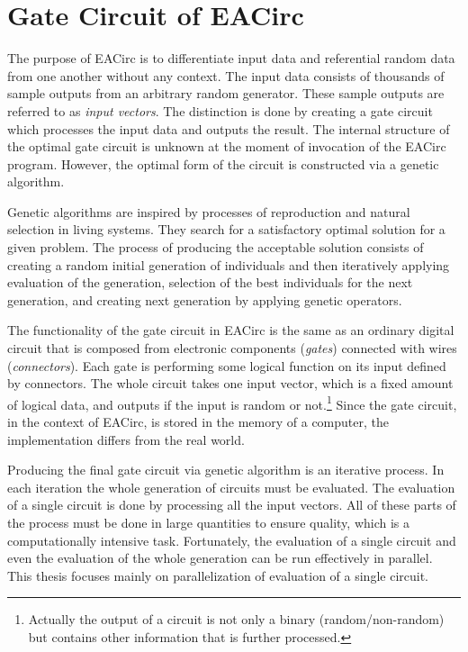 \documentclass[12pt,oneside]{fithesis2}
\begin{document}
\chapter{Gate Circuit of EACirc}

The purpose of EACirc is to differentiate input data and referential random data from one another without any context. The input data consists of thousands of sample outputs from an arbitrary random generator. These sample outputs are referred to as \emph{input vectors}. The distinction is done by creating a gate circuit which processes the input data and outputs the result. The internal structure of the optimal gate circuit is unknown at the moment of invocation of the EACirc program. However, the optimal form of the circuit is constructed via a genetic algorithm.~\cite{ukrop_thesis}

Genetic algorithms are inspired by processes of reproduction and natural selection in living systems. They search for a satisfactory optimal solution for a given problem. The process of producing the acceptable solution consists of creating a random initial generation of individuals and then iteratively applying evaluation of the generation, selection of the best individuals for the next generation, and creating next generation by applying genetic operators.~\cite{genetic_algorithms}

The functionality of the gate circuit in EACirc is the same as an ordinary digital circuit that is composed from electronic components (\emph{gates}) connected with wires (\emph{connectors}). Each gate is performing some logical function on its input defined by connectors. The whole circuit takes one input vector, which is a fixed amount of logical data, and outputs if the input is random or not.\footnote{Actually the output of a circuit is not only a binary (random/non-random) but contains other information that is further processed.} Since the gate circuit, in the context of EACirc, is stored in the memory of a computer, the implementation differs from the real world.

Producing the final gate circuit via genetic algorithm is an iterative process. In each iteration the whole generation of circuits must be evaluated. The evaluation of a single circuit is done by processing all the input vectors. All of these parts of the process must be done in large quantities to ensure quality, which is a computationally intensive task. Fortunately, the evaluation of a single circuit and even the evaluation of the whole generation can be run effectively in parallel. This thesis focuses mainly on parallelization of evaluation of a single circuit.
\end{document}
